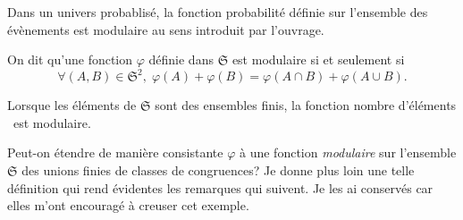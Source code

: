 Dans un univers probablisé, la fonction probabilité définie sur l'ensemble des évènements est modulaire au sens introduit par l'ouvrage. 
\begin{defi}
  On dit qu'une fonction $\varphi$ définie dans $\mathfrak{S}$ est modulaire si et seulement si
  \begin{displaymath}
    \forall (A,B)\in \mathfrak{S}^2,\; \varphi(A) + \varphi(B) = \varphi(A\cap B) + \varphi(A \cup B).
  \end{displaymath}
\end{defi}
\begin{rem}
  Lorsque les éléments de $\mathfrak{S}$ sont des ensembles finis, la fonction \og nombre d'éléments \fg \, est modulaire.
\end{rem}

\noindent Peut-on étendre de manière consistante $\varphi$ à une fonction \emph{modulaire} sur l'ensemble $\mathfrak{S}$ des unions finies de classes de congruences?\newline
Je donne plus loin une telle définition qui rend évidentes les remarques qui suivent. Je les ai conservés car elles m'ont encouragé à creuser cet exemple.
